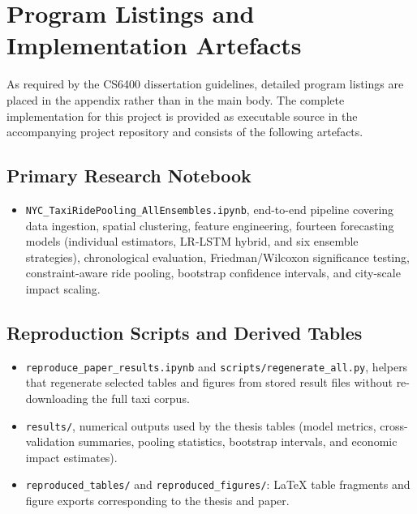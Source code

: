 \chapter{Program Listings and Implementation Artefacts}
\label{ch:appendix-artefacts}

As required by the CS6400 dissertation guidelines, detailed program listings are placed in the appendix rather than in the main body. The complete implementation for this project is provided as executable source in the accompanying project repository and consists of the following artefacts.

\section{Primary Research Notebook}

\begin{itemize}
 \item \texttt{NYC\_TaxiRidePooling\_AllEnsembles.ipynb}, end-to-end pipeline covering data ingestion, spatial clustering, feature engineering, fourteen forecasting models (individual estimators, LR-LSTM hybrid, and six ensemble strategies), chronological evaluation, Friedman/Wilcoxon significance testing, constraint-aware ride pooling, bootstrap confidence intervals, and city-scale impact scaling.
\end{itemize}

\section{Reproduction Scripts and Derived Tables}

\begin{itemize}
 \item \texttt{reproduce\_paper\_results.ipynb} and \texttt{scripts/regenerate\_all.py}, helpers that regenerate selected tables and figures from stored result files without re-downloading the full taxi corpus.
 \item \texttt{results/}, numerical outputs used by the thesis tables (model metrics, cross-validation summaries, pooling statistics, bootstrap intervals, and economic impact estimates).
 \item \texttt{reproduced\_tables/} and \texttt{reproduced\_figures/}: LaTeX table fragments and figure exports corresponding to the thesis and paper.
\end{itemize}

